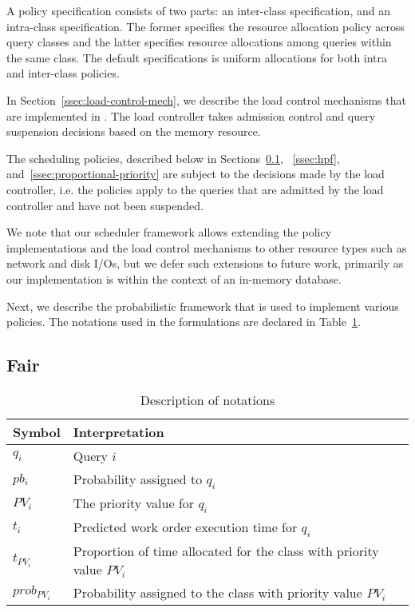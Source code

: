 A policy specification consists of two parts: an inter-class specification, and an intra-class specification. 
The former specifies the resource allocation policy across query classes and the latter specifies resource allocations among queries within the same class. 
The default specifications is uniform allocations for both intra and inter-class policies. 

In Section~\ref{ssec:load-control-mech}, we describe the load control mechanisms that are implemented in \sys{}. 
The load controller takes admission control and query suspension decisions based on the memory resource.

The scheduling policies, described below in Sections~\ref{ssec:fairness}, ~\ref{ssec:hpf}, and~\ref{ssec:proportional-priority} are subject to the decisions made by the load controller, i.e. the policies apply to the queries that are admitted by the load controller and have not been suspended. %

We note that our scheduler framework allows extending the policy implementations and the load control mechanisms to other resource types such as network and disk I/Os, but we defer such extensions to future work, primarily as our implementation is within the context of an in-memory database. 

Next, we describe the probabilistic framework that is used to implement various policies. 
The notations used in the formulations are declared in Table~\ref{table:policy-notations}.
\subsection{Fair}\label{ssec:fairness}
\begin{table}[]
	\centering
	\begin{tabular}{|p{}|p{}|}
		\hline
		\textbf{Symbol} & \textbf{Interpretation} \\ \hline
		$q_{i}$ & Query $i$ \\ \hline
		$pb_{i}$ & Probability assigned to $q_{i}$ \\ \hline
		$PV_{i}$ & The priority value for $q_{i}$ \\ \hline
		$t_{i}$ & Predicted work order execution time for $q_{i}$ \\ \hline
		$t_{PV_{i}}$ & Proportion of time allocated for the class with priority value $PV_{i}$ \\ \hline
		$prob_{PV_{i}}$ & Probability assigned to the class with priority value $PV_{i}$ \\ \hline
	\end{tabular}
	\vspace{0.4em}
	\caption{Description of notations}
	\label{table:policy-notations}
	\vspace{-2.5em}
\end{table}

